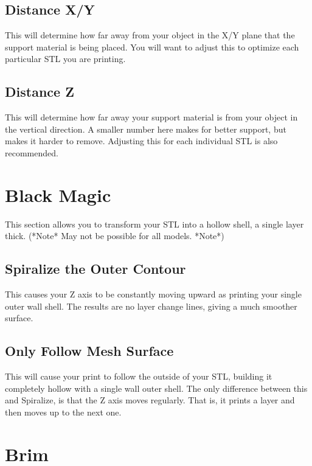 \subsection{Distance X/Y}

This will determine how far away from your object in the X/Y plane that the support material is being placed. You will want to adjust this to optimize each particular STL you are printing.

\subsection{Distance Z}

This will determine how far away your support material is from your object in the vertical direction. A smaller number here makes for better support, but makes it harder to remove. Adjusting this for each individual STL is also recommended.

\section{Black Magic}

This section allows you to transform your STL into a hollow shell, a single layer thick. (*Note* May not be possible for all models. *Note*)

\subsection{Spiralize the Outer Contour}

This causes your Z axis to be constantly moving upward as printing your single outer wall shell. The results are no layer change lines, giving a much smoother surface.

\subsection{Only Follow Mesh Surface}

This will cause your print to follow the outside of your STL, building it completely hollow with a single wall outer shell. The only difference between this and Spiralize, is that the Z axis moves regularly. That is, it prints a layer and then moves up to the next one.

\section{Brim}

